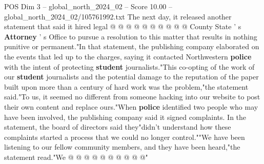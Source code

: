 \begin{textsample}{POS Dim 3 – global\_north\_2024\_02 – Score 10.00 – global\_north\_2024\_02/105761992.txt}
The next day, it released another statement that said it hired legal @ @ @ @ @ @ @ @ @ @ County State ' s \textbf{Attorney} ' s Office to pursue a resolution to this matter that results in nothing punitive or permanent."In that statement, the publishing company elaborated on the events that led up to the charges, saying it contacted Northwestern \textbf{police} with the intent of protecting \textbf{student} journalists."This co-opting of the work of our \textbf{student} journalists and the potential damage to the reputation of the paper built upon more than a century of hard work was the problem,"the statement said."To us, it seemed no different from someone hacking into our website to post their own content and replace ours."When \textbf{police} identified two people who may have been involved, the publishing company said it signed complaints.
In the statement, the board of directors said they"didn't understand how these complaints started a process that we could no longer control.""We have been listening to our fellow community members, and they have been heard,"the statement read."We @ @ @ @ @ @ @ @ @ @"

\end{textsample}
